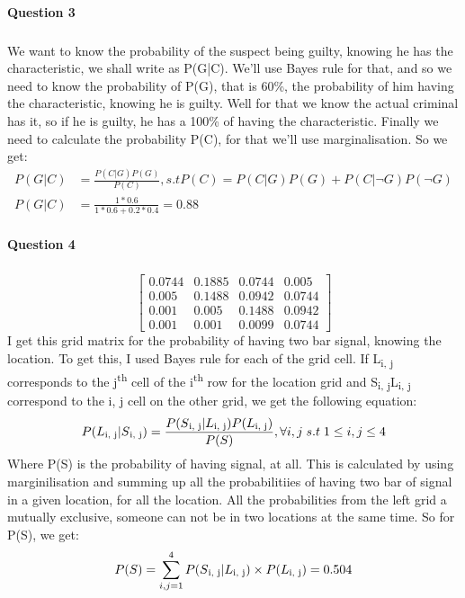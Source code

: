\documentclass{article}
\begin{document}
\paragraph{Question 3}
\subparagraph{}
We want to know the probability of the suspect being guilty, knowing he has the characteristic, we shall write as P(G|C). We'll use Bayes rule for that, and so we need to know the probability of P(G), that is 60\%, the probability of him having the characteristic, knowing he is guilty. Well for that we know the actual criminal has it, so if he is guilty, he has a 100\% of having the characteristic. Finally we need to calculate the probability P(C), for that we'll use marginalisation.
So we get:
\begin{equation*}
\begin{split}
P(G|C) & = \frac{P(C|G)P(G)}{P(C)}, s.t P(C) = P(C|G)P(G)+P(C|\lnot G)P(\lnot G) \\ 
P(G|C) & = \frac{1*0.6}{1*0.6 + 0.2*0.4} = 0.88
\end{split}
\end{equation*}
\paragraph{Question 4}
\subparagraph{}
\[
\begin{bmatrix}
0.0744 & 0.1885 & 0.0744 & 0.005 \\ 0.005 & 0.1488 & 0.0942 & 0.0744 \\ 0.001 & 0.005 & 0.1488 & 0.0942 \\ 0.001 & 0.001 & 0.0099 & 0.0744
\end{bmatrix}
\]
I get this grid matrix for the probability of having two bar signal, knowing the location. To get this, I used Bayes rule for each of the grid cell. If L\textsubscript{i, j} corresponds to the j\textsuperscript{th} cell of the 
i\textsuperscript{th} row for the location grid and S\textsubscript{i, j}\textbar L\textsubscript{i, j} correspond to the i, j cell on the other grid, we get the following equation:
\begin{equation*}
\begin{split}
P(L\textsubscript{i, j}|S\textsubscript{i, j}) = \frac{P(S\textsubscript{i, j}|L\textsubscript{i, j})P(L\textsubscript{i, j})}
{P(S)}, \forall i, j\;s.t\;1\leq i, j\leq 4
\end{split}
\end{equation*}
Where P(S) is the probability of having signal, at all. This is calculated by using marginilisation and summing up
all the probabilitiies of having two bar of signal in a given location, for all the location. All the probabilities from the left grid a mutually exclusive, someone can not be in two locations at the same time. So for P(S), we get:
\begin{equation*}
\begin{split}
P(S) = \sum_{i, j=1}^{4} P(S\textsubscript{i, j}|L\textsubscript{i, j})\times P(L\textsubscript{i, j}) = 0.504
\end{split}
\end{equation*}	
\end{document}
